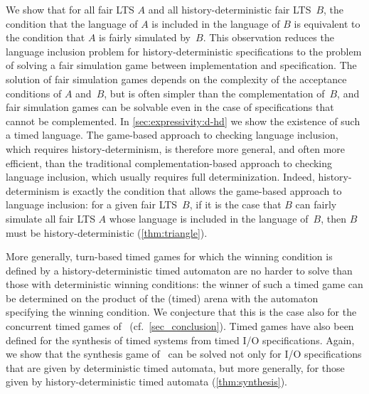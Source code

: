 We show that for all fair LTS $A$ and all history-deterministic fair LTS~$B$,
the condition that the language of $A$ is included in the language of $B$ is
equivalent to the condition that $A$ is fairly simulated by~$B$.
This observation reduces the language inclusion problem for history-deterministic
specifications to the problem of solving a fair simulation game between
implementation and specification.
The solution of fair simulation games depends on the complexity of the acceptance
conditions of $A$ and~$B$, but is often simpler than the complementation of~$B$,
and fair simulation games can be solvable even in the case of specifications that
cannot be complemented.
In \cref{sec:expressivity:d-hd} we show the existence of such a timed language.
The game-based approach to checking language inclusion,
which requires history-determinism,
is therefore more general, and often more efficient,
than the traditional complementation-based approach to checking language inclusion,
which usually requires full determinization.
Indeed, history-determinism is exactly the condition that allows the game-based
approach to language inclusion:
for a given fair LTS~$B$, if it is the case that $B$ can fairly simulate all fair
LTS $A$ whose language is included in the language of~$B$,
then $B$ must be history-deterministic (\cref{thm:triangle}).


More generally, turn-based timed games for which the winning
condition is defined by a history-deterministic timed automaton are no harder to solve than those with deterministic winning conditions:
the winner of such a timed game can be determined on the product of the (timed)
arena with the automaton specifying the winning condition.
We conjecture that this is the case
also for the concurrent timed games of~\cite{DFHM03}
(cf.~\cref{sec_conclusion}).
Timed games have also been defined for the synthesis of timed systems from timed I/O
specifications.
Again, we show that the synthesis game of~\cite{DM2002} can be solved not only for
I/O specifications that are given by deterministic timed automata,
but more generally, for those given by history-deterministic
timed automata (\cref{thm:synthesis}).

